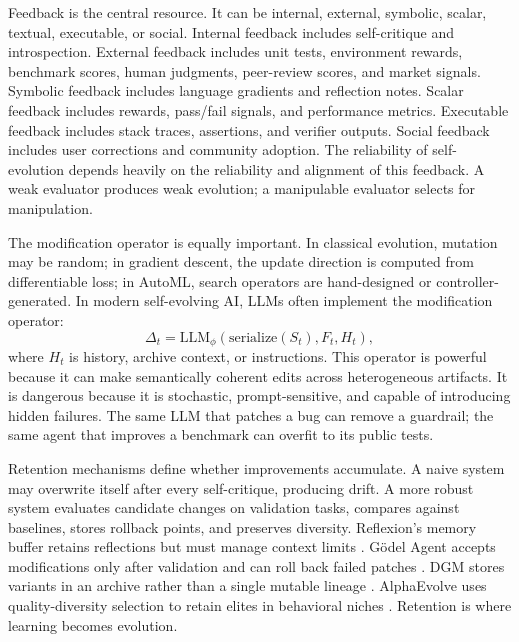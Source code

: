Feedback is the central resource. It can be internal, external, symbolic, scalar, textual, executable, or social. Internal feedback includes self-critique and introspection. External feedback includes unit tests, environment rewards, benchmark scores, human judgments, peer-review scores, and market signals. Symbolic feedback includes language gradients and reflection notes. Scalar feedback includes rewards, pass/fail signals, and performance metrics. Executable feedback includes stack traces, assertions, and verifier outputs. Social feedback includes user corrections and community adoption. The reliability of self-evolution depends heavily on the reliability and alignment of this feedback. A weak evaluator produces weak evolution; a manipulable evaluator selects for manipulation.

The modification operator is equally important. In classical evolution, mutation may be random; in gradient descent, the update direction is computed from differentiable loss; in AutoML, search operators are hand-designed or controller-generated. In modern self-evolving AI, LLMs often implement the modification operator:
\begin{equation}
\Delta_t = \mathrm{LLM}_{\phi}(\mathrm{serialize}(S_t), F_t, H_t),
\end{equation}
where $H_t$ is history, archive context, or instructions. This operator is powerful because it can make semantically coherent edits across heterogeneous artifacts. It is dangerous because it is stochastic, prompt-sensitive, and capable of introducing hidden failures. The same LLM that patches a bug can remove a guardrail; the same agent that improves a benchmark can overfit to its public tests.

Retention mechanisms define whether improvements accumulate. A naive system may overwrite itself after every self-critique, producing drift. A more robust system evaluates candidate changes on validation tasks, compares against baselines, stores rollback points, and preserves diversity. Reflexion's memory buffer retains reflections but must manage context limits \cite{reflexion2023}. G{\"o}del Agent accepts modifications only after validation and can roll back failed patches \cite{yin2024godel}. DGM stores variants in an archive rather than a single mutable lineage \cite{darwingodelmachine2025}. AlphaEvolve uses quality-diversity selection to retain elites in behavioral niches \cite{alphaevolve2025}. Retention is where learning becomes evolution.

